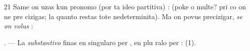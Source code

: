 \begin{VUpage}[25]{21}
\VUblancAlinea
Same on uzas  kun pronomo (por ta ideo partitiva) :\nl
{} (poke o multe? pri co on ne pre\cc
cizigas; la quanto restas tote nedeterminita). Ma on povus\nl
precizigar, \textit{se on volus} : 

\VUblancAlinea
\VUsaut{3.0mm}
\VUsaut{5.2mm}

. --- La \textit{substantivo} finas en singularo per , en plu\cc
ralo per  :  (1).
\end{VUpage}

